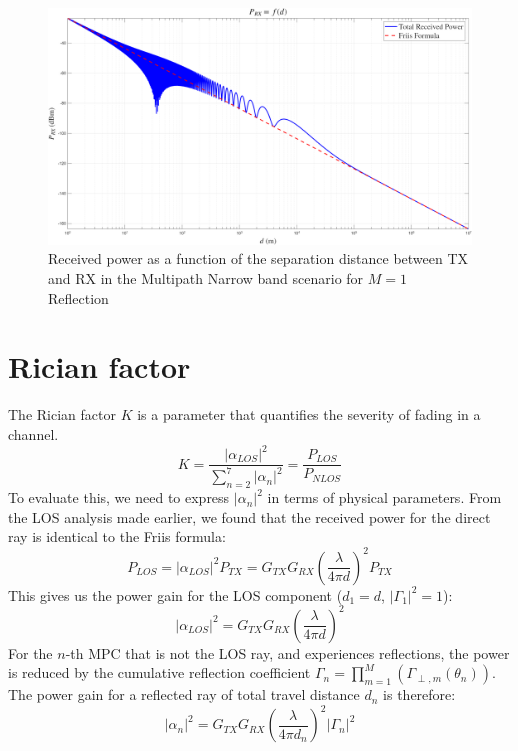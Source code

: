 \begin{figure}[h!]
	\centering
	\includegraphics[width=\linewidth]{content/4-images/PRX-vs-Friis.png} %
	\caption{Received power as a function of the separation distance between TX and RX in the Multipath Narrow band scenario for $M=1$ Reflection}
	\label{fig:pRX_vs_friis}
\end{figure}

\section{Rician factor}
The Rician factor $K$ is a parameter that quantifies the severity of fading in a channel. 
\begin{equation}
	K = \frac{|\alpha_{LOS}|^2}{\sum_{n=2}^{7} |\alpha_n|^2} = \frac{P_{LOS}}{P_{NLOS}}
\end{equation}
To evaluate this, we need to express $|\alpha_n|^2$ in terms of physical parameters. From the LOS analysis made earlier, we found that the received power for the direct ray is identical to the Friis formula:
\begin{equation}
	P_{LOS} = |\alpha_{LOS}|^2 P_{TX} = G_{TX} G_{RX} \left( \frac{\lambda}{4\pi d} \right)^2 P_{TX}
\end{equation}
This gives us the power gain for the LOS component ($d_1 = d$, $|\Gamma_1|^2=1$):
\begin{equation}
	|\alpha_{LOS}|^2 = G_{TX} G_{RX} \left( \frac{\lambda}{4\pi d} \right)^2
\end{equation}
For the $n$-th MPC that is not the LOS ray, and experiences reflections, the power is reduced by the cumulative reflection coefficient $\Gamma_n = \prod_{m=1}^{M}(\Gamma_{\perp, m}(\theta_{n}))$. The power gain for a reflected ray of total travel distance $d_n$ is therefore:
\begin{equation}
	|\alpha_n|^2 = G_{TX} G_{RX} \left( \frac{\lambda}{4\pi d_n} \right)^2 |\Gamma_n|^2
\end{equation}

